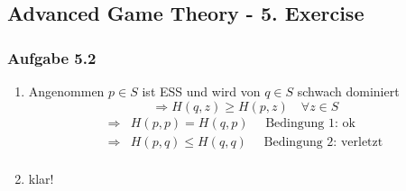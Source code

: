 \documentclass[12pt]{extreport} %
\theoremstyle{named}
\theoremstyle{itshape}
\theoremstyle{normal}
\begin{document}
\subsection*{Advanced Game Theory - 5. Exercise}

\subsubsection*{Aufgabe 5.2}  
    
  \begin{enumerate}[label=\alph*\upshape)]
  	\item Angenommen $p \in S$ ist ESS  und wird von $q \in S$ schwach dominiert
  		$$ \Rightarrow H(q, z) \geq H(p, z) \quad \forall z \in S $$
  		\begin{align*}
  			\Rightarrow & H(p,p) = H(q, p) \quad \text{ Bedingung 1: ok} \\
  			\Rightarrow & H(p,q) \leq H(q, q) \quad \text{ Bedingung 2: verletzt} \\
  		\end{align*} \setcounter{enumi}{2}
  	\item klar!
  \end{enumerate}
   
\end{document}
